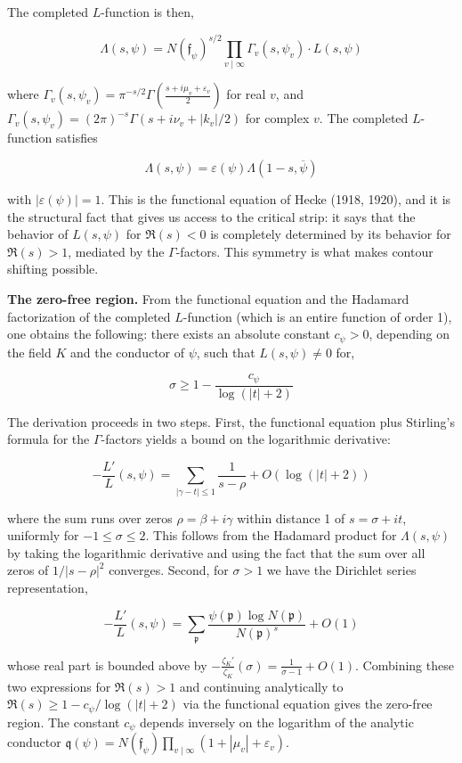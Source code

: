 \documentclass[12pt,a4paper]{article}
\begin{document}
The completed $L$-function is then,

\[
\Lambda(s, \psi) = N(\mathfrak{f}_{\psi})^{s/2} \prod_{v \mid \infty} \Gamma_{\!v}(s, \psi_v) \cdot L(s, \psi)
\]

where $\Gamma_{\!v}(s, \psi_v) = \pi^{-s/2} \Gamma\!\left(\frac{s + i\mu_v + \varepsilon_v}{2}\right)$ for real $v$, and $\Gamma_{\!v}(s, \psi_v) = (2\pi)^{-s} \Gamma(s + i\nu_v + |k_v|/2)$ for complex $v$. The completed $L$-function satisfies

\[
\Lambda(s, \psi) = \varepsilon(\psi) \Lambda(1-s, \overline{\psi})
\]

with $|\varepsilon(\psi)| = 1$. This is the functional equation of Hecke (1918, 1920), and it is the structural fact that gives us access to the critical strip: it says that the behavior of $L(s, \psi)$ for $\Re(s) < 0$ is completely determined by its behavior for $\Re(s) > 1$, mediated by the $\Gamma$-factors. This symmetry is what makes contour shifting possible.

\textbf{The zero-free region.} From the functional equation and the Hadamard factorization of the completed $L$-function (which is an entire function of order 1), one obtains the following: there exists an absolute constant $c_{\psi} > 0$, depending on the field $K$ and the conductor of $\psi$, such that $L(s, \psi) \neq 0$ for,

\[
\sigma \geq 1 - \frac{c_{\psi}}{\log(|t|+2)}
\]

The derivation proceeds in two steps. First, the functional equation plus Stirling's formula for the $\Gamma$-factors yields a bound on the logarithmic derivative:

\[
-\frac{L'}{L}(s, \psi) = \sum_{|\gamma-t| \leq 1} \frac{1}{s-\rho} + O(\log(|t|+2))
\]

where the sum runs over zeros $\rho = \beta + i\gamma$ within distance 1 of $s = \sigma + it$, uniformly for $-1 \leq \sigma \leq 2$. This follows from the Hadamard product for $\Lambda(s, \psi)$ by taking the logarithmic derivative and using the fact that the sum over all zeros of $1/|s-\rho|^2$ converges. Second, for $\sigma > 1$ we have the Dirichlet series representation,

\[
-\frac{L'}{L}(s, \psi) = \sum_{\mathfrak{p}} \frac{\psi(\mathfrak{p}) \log N(\mathfrak{p})}{N(\mathfrak{p})^s} + O(1)
\]

whose real part is bounded above by $-\frac{\zeta_K'}{\zeta_K}(\sigma) = \frac{1}{\sigma-1} + O(1)$. Combining these two expressions for $\Re(s) > 1$ and continuing analytically to $\Re(s) \geq 1 - c_{\psi}/\log(|t|+2)$ via the functional equation gives the zero-free region. The constant $c_{\psi}$ depends inversely on the logarithm of the analytic conductor $\mathfrak{q}(\psi) = N(\mathfrak{f}_{\psi}) \prod_{v \mid \infty} (1 + |\mu_v| + \varepsilon_v)$.
\end{document}
